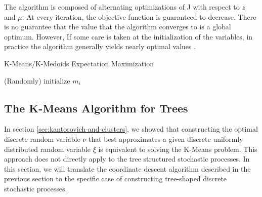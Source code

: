 The algorithm is composed of alternating optimizations of J with respect to $z$ and $\mu$. At every iteration, the objective function is guaranteed to decrease. There is no guarantee that the value that the algorithm converges to is a global optimum. However, If some care is taken at the initialization of the variables, in practice the algorithm generally yields nearly optimal values \cite{Arthur2006}.
\begin{algorithm}
  \label{alg:k-means}
  \caption{K-Means/K-Medoids Expectation Maximization}
  
  (Randomly) initialize $m_i$\;
\end{algorithm}
\subsection{The K-Means Algorithm for Trees}
\label{sec:k-means-algorithm-trees}
In section \ref{sec:kantorovich-and-clusters}, we showed that constructing the optimal discrete random variable $\nu$ that best approximates a given discrete uniformly distributed random variable $\xi$ is equivalent to solving the K-Means problem.
This approach does not directly apply to the tree structured stochastic processes.
In this section, we will translate the coordinate descent algorithm described in the previous section to the specific case of constructing tree-shaped discrete stochastic processes.

